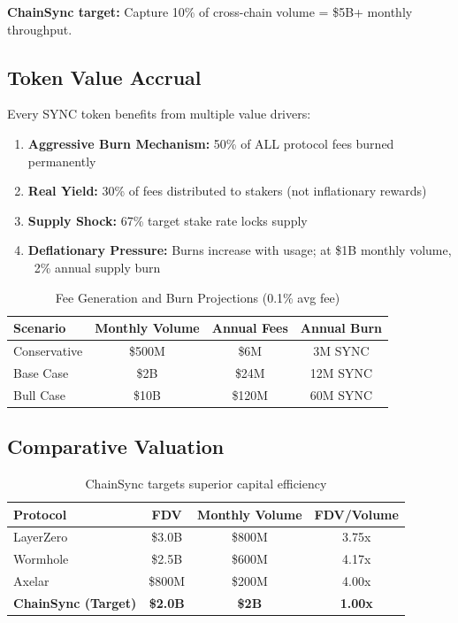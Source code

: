 \documentclass[12pt,a4paper]{article}
\begin{document}
\textbf{ChainSync target:} Capture 10\% of cross-chain volume = \$5B+ monthly throughput.

\subsection{Token Value Accrual}

Every SYNC token benefits from multiple value drivers:

\begin{enumerate}
    \item \textbf{Aggressive Burn Mechanism:} 50\% of ALL protocol fees burned permanently
    \item \textbf{Real Yield:} 30\% of fees distributed to stakers (not inflationary rewards)
    \item \textbf{Supply Shock:} 67\% target stake rate locks supply
    \item \textbf{Deflationary Pressure:} Burns increase with usage; at \$1B monthly volume, ~2\% annual supply burn
\end{enumerate}

\begin{table}[h]
\centering
\begin{tabular}{lccc}
\toprule
\textbf{Scenario} & \textbf{Monthly Volume} & \textbf{Annual Fees} & \textbf{Annual Burn} \\
\midrule
Conservative & \$500M & \$6M & 3M SYNC \\
Base Case & \$2B & \$24M & 12M SYNC \\
Bull Case & \$10B & \$120M & 60M SYNC \\
\bottomrule
\end{tabular}
\caption{Fee Generation and Burn Projections (0.1\% avg fee)}
\end{table}

\subsection{Comparative Valuation}

\begin{table}[h]
\centering
\begin{tabular}{lccc}
\toprule
\textbf{Protocol} & \textbf{FDV} & \textbf{Monthly Volume} & \textbf{FDV/Volume} \\
\midrule
LayerZero & \$3.0B & \$800M & 3.75x \\
Wormhole & \$2.5B & \$600M & 4.17x \\
Axelar & \$800M & \$200M & 4.00x \\
\textbf{ChainSync (Target)} & \textbf{\$2.0B} & \textbf{\$2B} & \textbf{1.00x} \\
\bottomrule
\end{tabular}
\caption{ChainSync targets superior capital efficiency}
\end{table}
\end{document}
